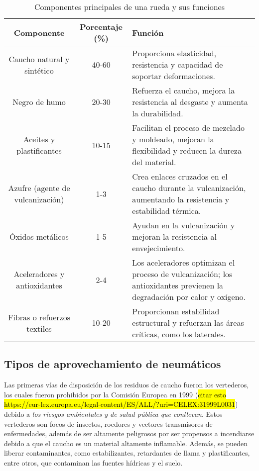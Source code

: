 \begin{table}[H]
\centering
\caption{Componentes principales de una rueda y sus funciones}
\label{tab:componentes_rueda}
\begin{tabular}{|c|c|p{7cm}|}
\hline
\textbf{Componente} & \textbf{Porcentaje (\%)} & \textbf{Función} \\ \hline
Caucho natural y sintético & 40-60 & Proporciona elasticidad, resistencia y capacidad de soportar deformaciones. \\ \hline
Negro de humo & 20-30 & Refuerza el caucho, mejora la resistencia al desgaste y aumenta la durabilidad. \\ \hline
Aceites y plastificantes & 10-15 & Facilitan el proceso de mezclado y moldeado, mejoran la flexibilidad y reducen la dureza del material. \\ \hline
Azufre (agente de vulcanización) & 1-3 & Crea enlaces cruzados en el caucho durante la vulcanización, aumentando la resistencia y estabilidad térmica. \\ \hline
Óxidos metálicos & 1-5 & Ayudan en la vulcanización y mejoran la resistencia al envejecimiento. \\ \hline
Aceleradores y antioxidantes & 2-4 & Los aceleradores optimizan el proceso de vulcanización; los antioxidantes previenen la degradación por calor y oxígeno. \\ \hline
Fibras o refuerzos textiles & 10-20 & Proporcionan estabilidad estructural y refuerzan las áreas críticas, como los laterales. \\ \hline
\end{tabular}
\end{table}



\subsection{\textbf{\large{Tipos de aprovechamiento de neumáticos}}}


Las primeras vías de disposición de los residuos de caucho fueron los vertederos, los cuales fueron prohibidos por la Comisión Europea en 1999 (\hl{citar esto https://eur-lex.europa.eu/legal-content/ES/ALL/?uri=CELEX:31999L0031}) debido a \textit{los riesgos ambientales y de salud pública que conllevan}. Estos vertederos son focos de insectos, roedores y vectores transmisores de enfermedades, además de ser altamente peligrosos por ser propensos a incendiarse debido a que el caucho es un material altamente inflamable. Además, se pueden liberar contaminantes, como estabilizantes, retardantes de llama y plastificantes, entre otros, que contaminan las fuentes hídricas y el suelo. \cite{Dorigato2023} 


